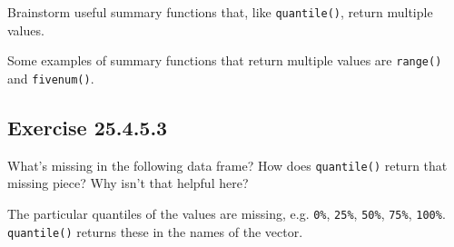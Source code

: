\documentclass[]{book}
\newenvironment{Shaded}{\begin{snugshade}}{\end{snugshade}}
\newcommand{\CommentTok}[1]{\textcolor[rgb]{0.56,0.35,0.01}{\textit{#1}}}
\newcommand{\DataTypeTok}[1]{\textcolor[rgb]{0.13,0.29,0.53}{#1}}
\newcommand{\KeywordTok}[1]{\textcolor[rgb]{0.13,0.29,0.53}{\textbf{#1}}}
\newcommand{\NormalTok}[1]{#1}
\newcommand{\OperatorTok}[1]{\textcolor[rgb]{0.81,0.36,0.00}{\textbf{#1}}}
\newcommand{\StringTok}[1]{\textcolor[rgb]{0.31,0.60,0.02}{#1}}
\theoremstyle{plain}
\theoremstyle{remark}
\begin{document}
Brainstorm useful summary functions that, like \texttt{quantile()},
return multiple values.

Some examples of summary functions that return multiple values are
\texttt{range()} and \texttt{fivenum()}.

\begin{Shaded}
\end{Shaded}

\hypertarget{exercise-25.4.5.3}{%
\subsection*{\texorpdfstring{Exercise
{25.4.5.3}}{Exercise 25.4.5.3}}\label{exercise-25.4.5.3}}

What's missing in the following data frame? How does \texttt{quantile()}
return that missing piece? Why isn't that helpful here?

\begin{Shaded}
\end{Shaded}

The particular quantiles of the values are missing, e.g. \texttt{0\%},
\texttt{25\%}, \texttt{50\%}, \texttt{75\%}, \texttt{100\%}.
\texttt{quantile()} returns these in the names of the vector.

\begin{Shaded}
\end{Shaded}
\end{document}

